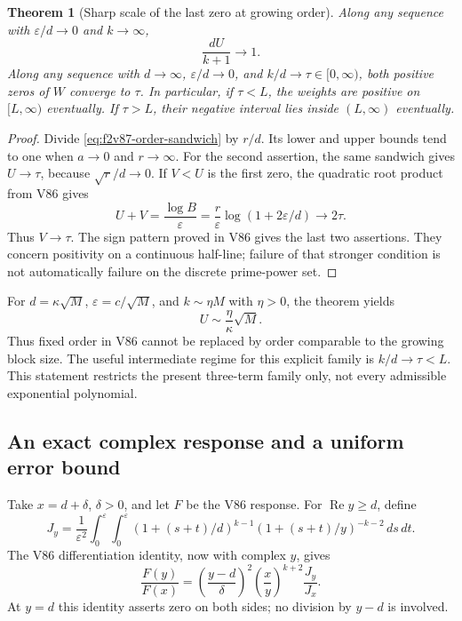 \documentclass[11pt]{article}
\newtheorem{theorem}{Theorem}[section]
\theoremstyle{definition}
\theoremstyle{remark}
\begin{document}
\begin{theorem}[Sharp scale of the last zero at growing order]
\label{thm:f2v87-order}
Along any sequence with \(\varepsilon/d\to0\) and \(k\to\infty\),
\begin{equation}
 \frac{dU}{k+1}\longrightarrow1.
 \label{eq:f2v87-order-limit}
\end{equation}
Along any sequence with \(d\to\infty\), \(\varepsilon/d\to0\), and
\(k/d\to\tau\in[0,\infty)\), both positive zeros of \(W\)
converge to \(\tau\).  In particular, if \(\tau<L\), the weights
are positive on \([L,\infty)\) eventually.  If \(\tau>L\), their
negative interval lies inside \((L,\infty)\) eventually.
\end{theorem}

\begin{proof}
Divide \eqref{eq:f2v87-order-sandwich} by \(r/d\).  Its lower and
upper bounds tend to one when \(a\to0\) and \(r\to\infty\).
For the second assertion, the same sandwich gives \(U\to\tau\),
because \(\sqrt r/d\to0\).  If \(V<U\) is the first zero, the
quadratic root product from V86 gives
\[
 U+V=\frac{\log B}{\varepsilon}
      =\frac{r}{\varepsilon}\log(1+2\varepsilon/d)
      \longrightarrow2\tau.
\]
Thus \(V\to\tau\).  The sign pattern proved in V86 gives the last
two assertions.  They concern positivity on a continuous half-line;
failure of that stronger condition is not automatically failure on the
discrete prime-power set.
\end{proof}

For \(d=\kappa\sqrt M\), \(\varepsilon=c/\sqrt M\), and
\(k\sim\eta M\) with \(\eta>0\), the theorem yields
\begin{equation}
 U\sim\frac{\eta}{\kappa}\sqrt M.
 \label{eq:f2v87-high-order}
\end{equation}
Thus fixed order in V86 cannot be replaced by order comparable to the
growing block size.  The useful intermediate regime for this explicit
family is \(k/d\to\tau<L\).  This statement restricts the present
three-term family only, not every admissible exponential polynomial.

\subsection{An exact complex response and a uniform error bound}

Take \(x=d+\delta\), \(\delta>0\), and let \(F\) be the V86 response.
For \(\operatorname{Re}y\ge d\), define
\begin{equation}
 J_y=\frac1{\varepsilon^2}\int_0^\varepsilon\!\int_0^\varepsilon
 (1+(s+t)/d)^{k-1}(1+(s+t)/y)^{-k-2}\,ds\,dt.
 \label{eq:f2v87-J}
\end{equation}
The V86 differentiation identity, now with complex \(y\), gives
\begin{equation}
 \frac{F(y)}{F(x)}=
 \left(\frac{y-d}{\delta}\right)^2
 \left(\frac{x}{y}\right)^{k+2}\frac{J_y}{J_x}.
 \label{eq:f2v87-complex-response}
\end{equation}
At \(y=d\) this identity asserts zero on both sides; no division by
\(y-d\) is involved.
\end{document}
